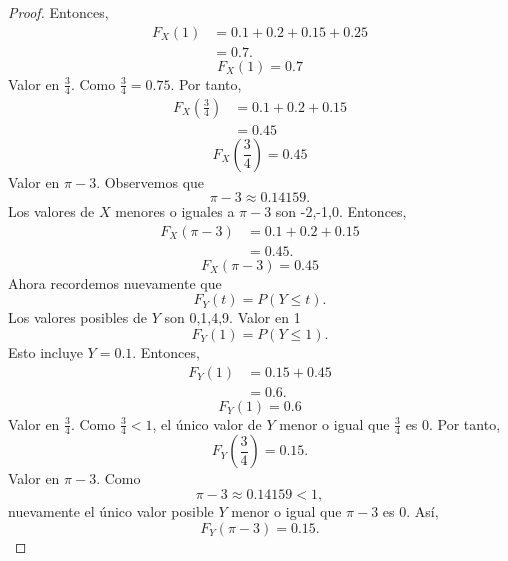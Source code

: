 \documentclass[12pt,a4paper]{article}
\newcommand{\paren}[1]{\left( #1 \right)}
\begin{document}
\begin{proof}
        Entonces,
        \begin{align*}
            F_{X}(1)&=0.1+0.2+0.15+0.25\\
            &=0.7.
        \end{align*}
        \begin{equation*}
            F_{X}(1)=0.7
        \end{equation*}
        Valor en $\frac{3}{4}$. Como $\frac{3}{4}=0.75$. Por tanto,
        \begin{align*}
            F_{X}\paren{\frac{3}{4}}&=0.1+0.2+0.15\\
            &=0.45
        \end{align*}
        \begin{equation*}
            F_{X}\paren{\frac{3}{4}}=0.45
        \end{equation*}
        Valor en $\pi-3$. Observemos que
        \begin{equation*}
            \pi-3\approx0.14159.
        \end{equation*}
        Los valores de $X$ menores o iguales a $\pi-3$ son -2,-1,0. Entonces,
        \begin{align*}
            F_{X}(\pi-3)&=0.1+0.2+0.15\\
            &=0.45.
        \end{align*}
        \begin{equation*}
            F_{X}(\pi-3)=0.45
        \end{equation*}
        Ahora recordemos nuevamente que
        \begin{equation*}
            F_{Y}(t)=P(Y\leq t).
        \end{equation*}
        Los valores posibles de $Y$ son 0,1,4,9. Valor en 1
        \begin{equation*}
            F_{Y}(1)=P(Y\leq1).
        \end{equation*}
        Esto incluye $Y=0.1$. Entonces,
        \begin{align*}
            F_{Y}(1)&=0.15+0.45\\
            &=0.6.
        \end{align*}
        \begin{equation*}
            F_{Y}(1)=0.6
        \end{equation*}
        Valor en $\frac{3}{4}$. Como $\frac{3}{4}\lt1$, el único valor de $Y$ menor o igual que $\frac{3}{4}$
        es 0. Por tanto,
        \begin{equation*}
            F_{Y}\paren{\frac{3}{4}}=0.15.
        \end{equation*}
        Valor en $\pi-3$. Como
        \begin{equation*}
            \pi-3\approx0.14159\lt1,
        \end{equation*}
        nuevamente el único valor posible $Y$ menor o igual que $\pi-3$ es 0. Así,
        \begin{equation*}
            F_{Y}(\pi-3)=0.15.
        \end{equation*}
    \end{proof}
\end{document}
